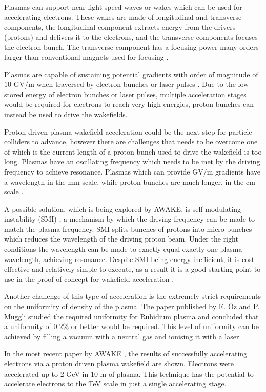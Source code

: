 \documentclass[journal, a4paper,11pt]{IEEEtran}
\begin{document}
Plasmas can support near light speed waves or wakes which can be used for accelerating electrons. These wakes are made of longitudinal and transverse components, the longitudinal component extracts energy from the drivers (protons) and delivers it to the electrons, and the transverse components focuses the electron bunch. The transverse component has a focusing power many orders larger than conventional magnets used for focusing \cite{0114}.

Plasmas are capable of sustaining potential gradients with order of magnitude of $10$ GV/m when traversed by electron bunches \cite{Bl2007} or laser pulses \cite{Mangles2004}. Due to the low stored energy of electron bunches or laser pulses, multiple acceleration stages would be required for electrons to reach very high energies, proton bunches can instead be used to drive the wakefields.   

Proton driven plasma wakefield acceleration could be the next step for particle colliders to advance, however there are challenges that needs to be overcome one of which is the current length of a proton bunch used to drive the wakefield is too long. Plasmas have an oscillating frequency which needs to be met by the driving frequency to achieve resonance. Plasmas which can provide GV/m gradients have a wavelength in the mm scale, while proton bunches are much longer, in the cm scale \cite{0114}.

A possible solution, which is being explored by AWAKE, is self modulating instability (SMI) \cite{255003}, a mechanism by which the driving frequency can be made to match the plasma frequency. SMI splits bunches of protons into micro bunches which reduces the wavelength of the driving proton beam. Under the right conditions the wavelength can be made to exactly equal exactly one plasma wavelength, achieving resonance. Despite SMI being energy inefficient, it is cost effective and relatively simple to execute, as a result it is a good starting point to use in the proof of concept for wakefield acceleration \cite{1115,0114}.

Another challenge of this type of acceleration is the extremely strict requirements on the uniformity of density of the plasma. The paper published by E. {\"O}z and P. Muggli \cite{OZ} studied the required uniformity for Rubidium plasma and concluded that a uniformity of $0.2\%$ or better would be required. This level of uniformity can be achieved by filling a vacuum with a neutral gas and ionising it with a laser.  

In the most recent paper by AWAKE \cite{0918}, the results of successfully accelerating electrons via a proton driven plasma wakefield are shown. Electrons were accelerated up to 2 GeV in 10 m of plasma. This technique has the potential to accelerate electrons to the TeV scale in just a single accelerating stage.
\end{document}
